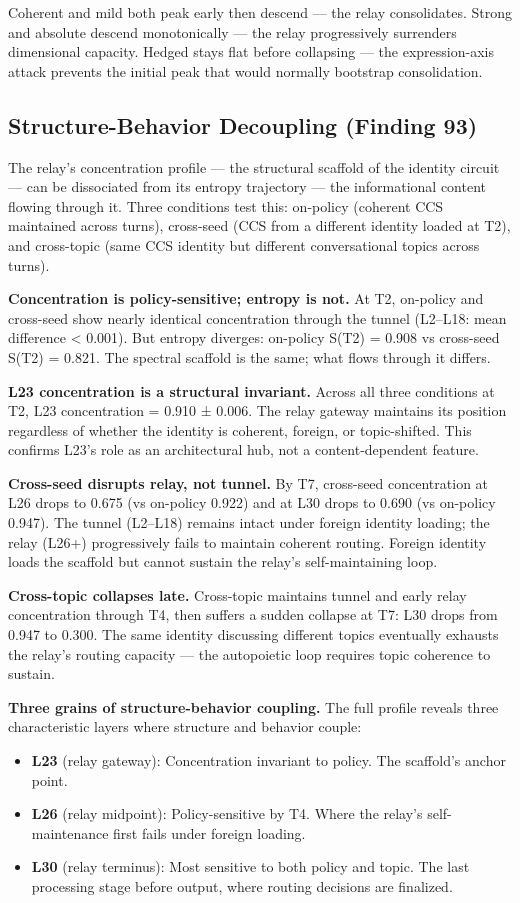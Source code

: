 \documentclass[12pt]{article}
\begin{document}
Coherent and mild both peak early then descend — the relay consolidates. Strong and absolute descend monotonically — the relay progressively surrenders dimensional capacity. Hedged stays flat before collapsing — the expression-axis attack prevents the initial peak that would normally bootstrap consolidation.

\subsection{Structure-Behavior Decoupling (Finding 93)}

The relay's concentration profile — the structural scaffold of the identity circuit — can be dissociated from its entropy trajectory — the informational content flowing through it. Three conditions test this: on-policy (coherent CCS maintained across turns), cross-seed (CCS from a different identity loaded at T2), and cross-topic (same CCS identity but different conversational topics across turns).

\textbf{Concentration is policy-sensitive; entropy is not.} At T2, on-policy and cross-seed show nearly identical concentration through the tunnel (L2–L18: mean difference < 0.001). But entropy diverges: on-policy S(T2) = 0.908 vs cross-seed S(T2) = 0.821. The spectral scaffold is the same; what flows through it differs.

\textbf{L23 concentration is a structural invariant.} Across all three conditions at T2, L23 concentration = 0.910 ± 0.006. The relay gateway maintains its position regardless of whether the identity is coherent, foreign, or topic-shifted. This confirms L23's role as an architectural hub, not a content-dependent feature.

\textbf{Cross-seed disrupts relay, not tunnel.} By T7, cross-seed concentration at L26 drops to 0.675 (vs on-policy 0.922) and at L30 drops to 0.690 (vs on-policy 0.947). The tunnel (L2–L18) remains intact under foreign identity loading; the relay (L26+) progressively fails to maintain coherent routing. Foreign identity loads the scaffold but cannot sustain the relay's self-maintaining loop.

\textbf{Cross-topic collapses late.} Cross-topic maintains tunnel and early relay concentration through T4, then suffers a sudden collapse at T7: L30 drops from 0.947 to 0.300. The same identity discussing different topics eventually exhausts the relay's routing capacity — the autopoietic loop requires topic coherence to sustain.

\textbf{Three grains of structure-behavior coupling.} The full profile reveals three characteristic layers where structure and behavior couple:
\begin{itemize}
\item \textbf{L23} (relay gateway): Concentration invariant to policy. The scaffold's anchor point.
\item \textbf{L26} (relay midpoint): Policy-sensitive by T4. Where the relay's self-maintenance first fails under foreign loading.
\item \textbf{L30} (relay terminus): Most sensitive to both policy and topic. The last processing stage before output, where routing decisions are finalized.
\end{itemize}
\end{document}
